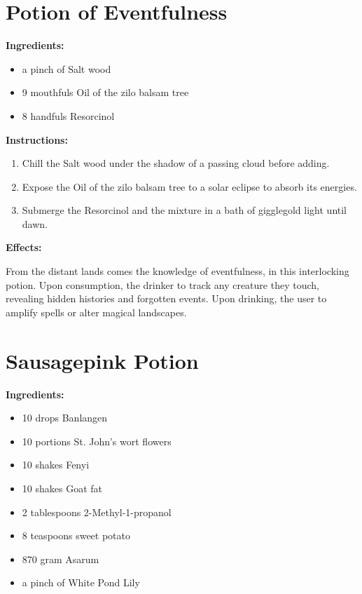 \documentclass{article}
\begin{document}
\newpage
\section*{Potion of Eventfulness}

\textbf{Ingredients:}

\begin{itemize}
  \item a pinch of Salt wood
  \item 9 mouthfuls Oil of the zilo balsam tree
  \item 8 handfuls Resorcinol
\end{itemize}

\textbf{Instructions:}

\begin{enumerate}
  \item Chill the Salt wood under the shadow of a passing cloud before adding.
  \item Expose the Oil of the zilo balsam tree to a solar eclipse to absorb its energies.
  \item Submerge the Resorcinol and the mixture in a bath of gigglegold light until dawn.
\end{enumerate}

\textbf{Effects:}

From the distant lands comes the knowledge of eventfulness, in this interlocking potion. Upon consumption, the drinker to track any creature they touch, revealing hidden histories and forgotten events. Upon drinking, the user to amplify spells or alter magical landscapes.

\newpage
\section*{Sausagepink Potion}

\textbf{Ingredients:}

\begin{itemize}
  \item 10 drops Banlangen
  \item 10 portions St. John's wort flowers
  \item 10 shakes Fenyi
  \item 10 shakes Goat fat
  \item 2 tablespoons 2-Methyl-1-propanol
  \item 8 teaspoons sweet potato
  \item 870 gram Asarum
  \item a pinch of White Pond Lily
\end{itemize}
\end{document}
